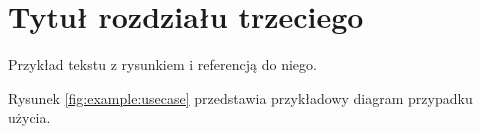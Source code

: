 \chapter{Tytuł rozdziału trzeciego}

Przykład tekstu z rysunkiem i referencją do niego.

Rysunek \ref{fig:example:usecase} 
przedstawia przykładowy diagram przypadku użycia.

